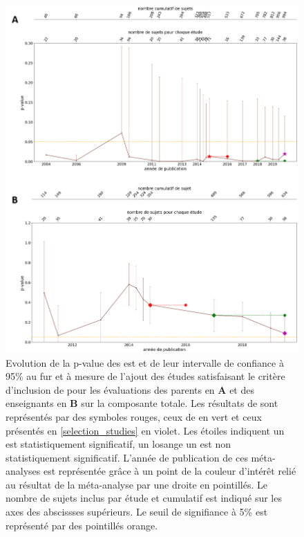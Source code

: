 \begin{figure}[h!]
  \centering
	\includegraphics[width=1\linewidth]{figures/chapter-2/meta-analysis-evolution-pvalue-total} 
  \caption{Evolution de la p-value des \gls{est} et de leur intervalle de confiance à 95\% au fur et à mesure de l'ajout des études satisfaisant le critère d'inclusion de \citet{Cortese2016} pour les évaluations des 
	parents en \textbf{A} et des enseignants en \textbf{B} sur la composante totale.
  Les résultats de \citep{Cortese2016} sont représentés par des symboles rouges, ceux de \citet{Bussalb2016clinical} en vert et ceux présentés en \ref{selection_studies} en violet. Les étoiles 
	indiquent un \gls{est} statistiquement significatif, un losange un \gls{est} non statistiquement significatif. L'année de publication de ces méta-analyses est représentée grâce à un point de la couleur 
	d'intérêt relié au résultat de la méta-analyse par une droite en pointillés.
	Le nombre de sujets inclus par étude et cumulatif est indiqué sur les axes des abscissses supérieurs.
	Le seuil de signifiance à 5\% est représenté par des pointillés orange.}
  \label{Figure:meta_analysis_evolution_pvalue_total}
\end{figure}

